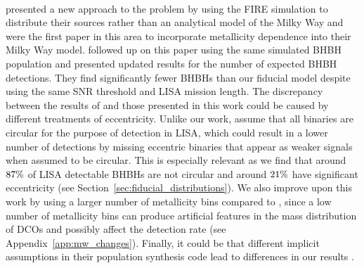 \paragraph{\citet{Lamberts+2018}} presented a new approach to the problem by using the FIRE simulation \citep{Hopkins+2014} to distribute their sources rather than an analytical model of the Milky Way and were the first paper in this area to incorporate metallicity dependence into their Milky Way model. \citet{Sesana+2020} followed up on this paper using the same simulated BHBH population and presented updated results for the number of expected BHBH detections. They find significantly fewer BHBHs than our fiducial model despite using the same SNR threshold and LISA mission length.
%
The discrepancy between the results of \citet{Sesana+2020} and those presented in this work could be caused by different treatments of eccentricity. Unlike our work, \citet{Sesana+2020} assume that all binaries are circular for the purpose of detection in LISA, which could result in a lower number of detections by missing eccentric binaries that appear as weaker signals when assumed to be circular. This is especially relevant as we find that around $87\%{}$ of LISA detectable BHBHs are not circular and around $21\%{}$ have significant eccentricity (see Section~\ref{sec:fiducial_distributions}). We also improve upon this work by using a larger number of metallicity bins compared to \citet{Sesana+2020}, since a low number of metallicity bins can produce artificial features in the mass distribution of DCOs and possibly affect the detection rate (see Appendix~\ref{app:mw_changes}). Finally, it could be that different implicit assumptions in their population synthesis code lead to differences in our results \citep{Toonen+2014}.

